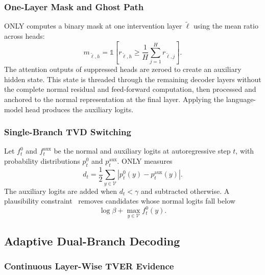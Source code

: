 \subsubsection{One-Layer Mask and Ghost Path}

ONLY computes a binary mask at one intervention layer $\tilde{\ell}$ using the mean ratio across heads:
\begin{equation}
m_{\tilde{\ell},h}
=
\mathbb{1}\!\left[
r_{\tilde{\ell},h}\geq
\frac{1}{H}\sum_{j=1}^{H}r_{\tilde{\ell},j}
\right].
\end{equation}
The attention outputs of suppressed heads are zeroed to create an auxiliary hidden state. This state is threaded through the remaining decoder layers without the complete normal residual and feed-forward computation, then processed and anchored to the normal representation at the final layer. Applying the language-model head produces the auxiliary logits.

\subsubsection{Single-Branch TVD Switching}

Let $f_t^{0}$ and $f_t^{\mathrm{aux}}$ be the normal and auxiliary logits at autoregressive step $t$, with probability distributions $p_t^{0}$ and $p_t^{\mathrm{aux}}$. ONLY measures
\begin{equation}
d_t
=
\frac{1}{2}\sum_{y\in\mathcal{V}}
\left|p_t^{0}(y)-p_t^{\mathrm{aux}}(y)\right|.
\end{equation}
The auxiliary logits are added when $d_t<\gamma$ and subtracted otherwise. A plausibility constraint~\cite{li2023contrastive} removes candidates whose normal logits fall below
\begin{equation}
\log\beta+\max_{y\in\mathcal{V}}f_t^{0}(y).
\end{equation}

\subsection{Adaptive Dual-Branch Decoding}

\subsubsection{Continuous Layer-Wise TVER Evidence}

